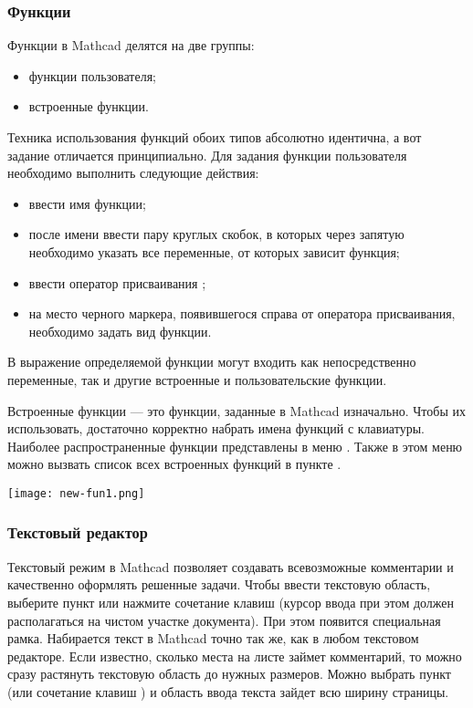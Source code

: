\subsubsection*{Функции}
Функции в Mathcad делятся на две группы:
\begin{itemize}
\item функции пользователя;
\item встроенные функции.
\end{itemize}
Техника использования функций обоих типов абсолютно идентична, а вот задание отличается принципиально. Для задания функции пользователя необходимо выполнить следующие действия:
\begin{itemize}
	\item ввести имя функции;
	\item после имени ввести пару круглых скобок, в которых через запятую необходимо указать все переменные, от которых зависит функция;
	\item ввести оператор присваивания \mc{:=};
	\item на место черного маркера, появившегося справа от оператора присваивания, необходимо задать вид функции.
\end{itemize}

В выражение определяемой функции могут входить как непосредственно переменные, так и другие встроенные и пользовательские функции. 

Встроенные функции --- это функции, заданные в Mathcad изначально. Чтобы их использовать, достаточно корректно набрать имена функций с клавиатуры. Наиболее распространенные функции представлены в меню . Также в этом меню можно вызвать список всех встроенных функций в пункте  .
\begin{center}
	\texttt{[image: new-fun1.png]}
\end{center}


\subsubsection*{Текстовый редактор}

Текстовый режим в Mathcad позволяет создавать всевозможные комментарии и качественно оформлять решенные задачи.
Чтобы ввести текстовую область, выберите пункт  или  нажмите сочетание клавиш  (курсор ввода при этом должен располагаться на чистом участке документа). При этом появится специальная рамка.
Набирается текст в Mathcad точно так же, как в любом текстовом редакторе. Если известно, сколько места на листе займет комментарий, то можно сразу растянуть текстовую область до нужных размеров. Можно выбрать пункт   (или сочетание клавиш  ) и область ввода текста зайдет всю ширину страницы.

